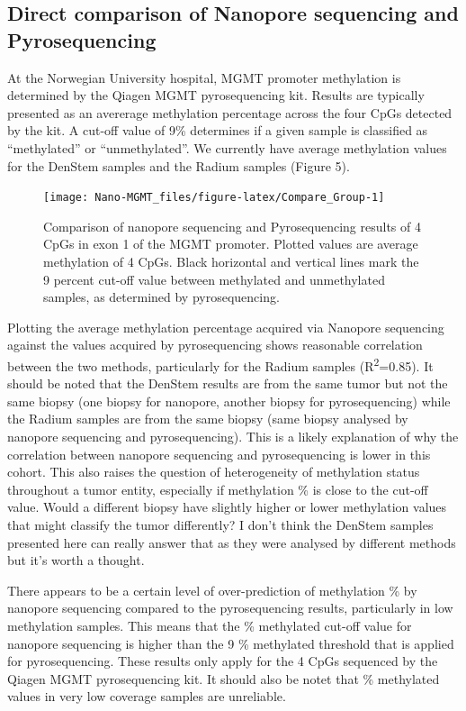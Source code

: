 \documentclass[
]{article}
\begin{document}
\hypertarget{direct-comparison-of-nanopore-sequencing-and-pyrosequencing}{%
\subsection{Direct comparison of Nanopore sequencing and
Pyrosequencing}\label{direct-comparison-of-nanopore-sequencing-and-pyrosequencing}}

At the Norwegian University hospital, MGMT promoter methylation is
determined by the Qiagen MGMT pyrosequencing kit. Results are typically
presented as an avererage methylation percentage across the four CpGs
detected by the kit. A cut-off value of 9\% determines if a given sample
is classified as ``methylated'' or ``unmethylated''. We currently have
average methylation values for the DenStem samples and the Radium
samples (Figure 5).

\begin{figure}
\texttt{[image: Nano-MGMT\_files/figure-latex/Compare\_Group-1]} \caption{Comparison of nanopore sequencing and Pyrosequencing results of 4 CpGs in exon 1 of the MGMT promoter. Plotted values are average methylation of 4 CpGs. Black horizontal and vertical lines mark the 9 percent cut-off value between methylated and unmethylated samples, as determined by pyrosequencing.}\label{fig:Compare_Group}
\end{figure}

Plotting the average methylation percentage acquired via Nanopore
sequencing against the values acquired by pyrosequencing shows
reasonable correlation between the two methods, particularly for the
Radium samples (R\textsuperscript{2}=0.85). It should be noted that the
DenStem results are from the same tumor but not the same biopsy (one
biopsy for nanopore, another biopsy for pyrosequencing) while the Radium
samples are from the same biopsy (same biopsy analysed by nanopore
sequencing and pyrosequencing). This is a likely explanation of why the
correlation between nanopore sequencing and pyrosequencing is lower in
this cohort. This also raises the question of heterogeneity of
methylation status throughout a tumor entity, especially if methylation
\% is close to the cut-off value. Would a different biopsy have slightly
higher or lower methylation values that might classify the tumor
differently? I don't think the DenStem samples presented here can really
answer that as they were analysed by different methods but it's worth a
thought.

There appears to be a certain level of over-prediction of methylation \%
by nanopore sequencing compared to the pyrosequencing results,
particularly in low methylation samples. This means that the \%
methylated cut-off value for nanopore sequencing is higher than the 9 \%
methylated threshold that is applied for pyrosequencing. These results
only apply for the 4 CpGs sequenced by the Qiagen MGMT pyrosequencing
kit. It should also be notet that \% methylated values in very low
coverage samples are unreliable.
\end{document}
